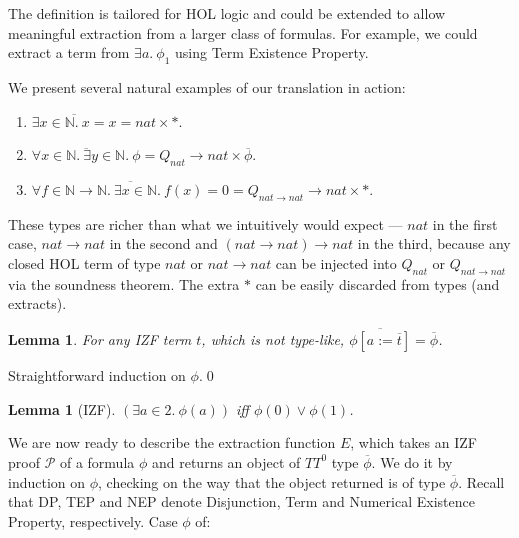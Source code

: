 \documentclass{LMCS}
\newtheorem{lemma}[thm]{Lemma}
\newcommand{\ov}[1]{\ensuremath{\overline{#1}}}
\newcommand{\nat}{\ensuremath{\mathbb{N}}}
\newcommand{\st}{*}
\newcommand{\pr}[1]{\mathcal{#1}}
\begin{document}
The definition is tailored for HOL logic and could be extended to allow meaningful extraction from
a larger class of formulas. For example, we could extract a term from $\exists a.\
\phi_1$ using Term Existence Property. 

We present several natural examples of our translation in action:
\begin{enumerate}[(1)]
\item $\ov{\exists x \in \nat.\ x = x} = nat \times \st$.
\item $\ov{\forall x \in \nat.\  \exists y \in \nat.\ \phi} = Q_{nat} \to nat
\times \ov{\phi}$.
\item $\ov{\forall f \in \nat \to \nat.\  \exists x \in \nat.\ f(x) = 0} = 
Q_{nat \to nat} \to nat \times \st$. 
\end{enumerate}

These types are richer than what we intuitively would expect --- $nat$ in
the first case, $nat \to nat$ in the second and $(nat \to nat) \to nat$ in
the third, because any closed HOL term of type $nat$ or $nat \to nat$ can be
injected into $Q_{nat}$ or $Q_{nat \to nat}$ via the soundness theorem. The extra $\st$ can be easily
discarded from types (and extracts).

\begin{lemma}\label{ovsubst}
For any IZF term $t$, which is not type-like, $\ov{\phi[a:=\ov{t}]} = \ov{\phi}$. 
\end{lemma}
\proof
Straightforward induction on $\phi$.\qed


\begin{lemma}[IZF]\label{l2}
$(\exists a \in 2.\ \phi(a))$ iff $\phi(0) \lor \phi(1)$. 
\end{lemma}

We are now ready to describe the extraction function $E$, which takes an IZF
proof $\pr{P}$ of a
formula $\phi$ and returns an object of $TT^0$ type $\ov{\phi}$. We do it by
induction on $\phi$, checking on the way that the object returned is
of type $\ov{\phi}$. Recall that DP, TEP and NEP denote Disjunction, Term
and Numerical Existence Property, respectively. Case $\phi$ of:
\end{document}
